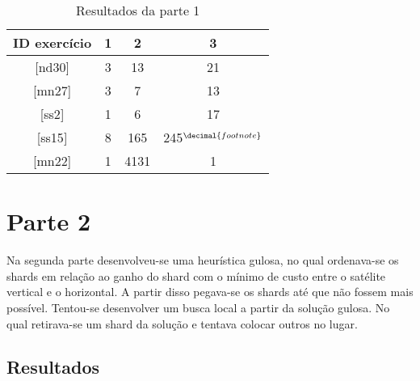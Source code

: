 \documentclass[11pt,letterpaper]{article}
\begin{document}
\begin{table}[h!]
\begin{centering}
\begin{tabular}{|c|c|c|c|}
\hline 
ID exercício & 1 & 2 & 3\tabularnewline
\hline 
\hline 
{[}nd30{]}  & 3 & 13  & 21 \tabularnewline
\hline 
 {[}mn27{]} & 3 & 7 & 13 \tabularnewline
\hline 
 {[}ss2{]} & 1 & 6  & 17 \tabularnewline
\hline 
{[}ss15{]} & 8 & 165  & 245$^{\decimal{footnote}}$\addtocounter{footnote}{1}  \tabularnewline
\hline 
 {[}mn22{]} & 1 & 4131  & 1 \tabularnewline
\hline 
\end{tabular}
\par\end{centering}
\caption{Resultados da parte 1}
\end{table}

\addtocounter{footnote}{-1} 
\section{Parte 2}

Na segunda parte desenvolveu-se uma heurística gulosa, no qual
ordenava-se os shards em relação ao ganho do shard com o mínimo de
custo entre o satélite vertical e o horizontal.
A partir disso pegava-se os shards até que não fossem mais possível.
Tentou-se desenvolver um busca local a partir da solução gulosa.
No qual retirava-se um shard da solução e tentava colocar outros no lugar.

\subsection{Resultados}


\addtocounter{footnote}{1}
\end{document}
